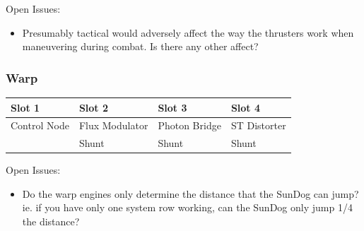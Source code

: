 Open Issues:
\begin{itemize}
\item Presumably tactical would adversely affect the way the thrusters
work when maneuvering during combat.  Is there any other affect?
\end{itemize}

\subsubsection{Warp}

\begin{tabular}{ | p{2.5cm} | p{2.5cm} | p{2.5cm} | p{2.5cm} | }
\hline
Slot 1 & Slot 2 & Slot 3 & Slot 4 \\ \hline
Control Node & Flux Modulator & Photon Bridge & ST Distorter \\
& Shunt & Shunt & Shunt \\
\hline
\end{tabular}

Open Issues:
\begin{itemize}
\item Do the warp engines only determine the distance that the SunDog
can jump?  ie. if you have only one system row working, can the SunDog
only jump 1/4 the distance?
\end{itemize}

